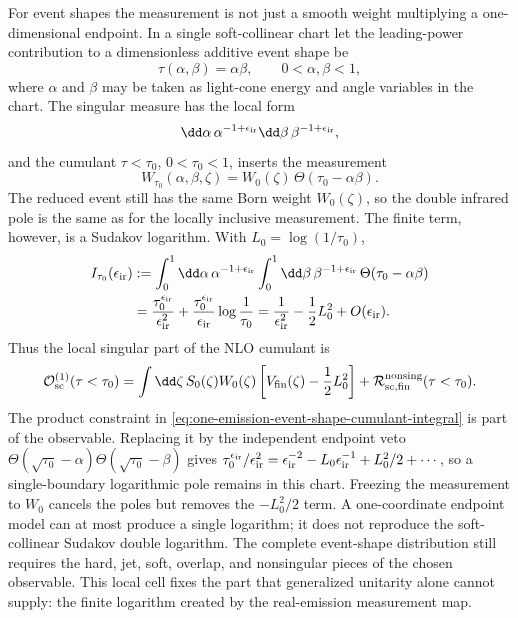\begin{controlledapproximation}
\label{ca:one-loop-event-shape-cumulant-cell}
For event shapes the measurement is not just a smooth weight multiplying a
one-dimensional endpoint.  In a single soft-collinear chart let the leading-power
contribution to a dimensionless additive event shape be
\[
  \tau(\alpha,\beta)=\alpha\beta,
  \qquad
  0<\alpha,\beta<1 ,
\]
where \(\alpha\) and \(\beta\) may be taken as light-cone energy and angle
variables in the chart.  The singular measure has the local form
\[
  \dd\alpha\,\alpha^{-1+\epsilon_{\rm ir}}
  \dd\beta\,\beta^{-1+\epsilon_{\rm ir}},
\]
and the cumulant \(\tau<\tau_0\), \(0<\tau_0<1\), inserts the measurement
\[
  W_{\tau_0}(\alpha,\beta,\zeta)
  =
  W_0(\zeta)\,\Theta(\tau_0-\alpha\beta).
\]
The reduced event still has the same Born weight \(W_0(\zeta)\), so the double
infrared pole is the same as for the locally inclusive measurement.  The finite
term, however, is a Sudakov logarithm.  With
\(L_0=\log(1/\tau_0)\),
\begin{equation}
\begin{aligned}
  I_{\tau_0}(\epsilon_{\rm ir})
  &:=
  \int_0^1\dd\alpha\,\alpha^{-1+\epsilon_{\rm ir}}
  \int_0^1\dd\beta\,\beta^{-1+\epsilon_{\rm ir}}\,
    \Theta(\tau_0-\alpha\beta) \\
  &=
  \frac{\tau_0^{\epsilon_{\rm ir}}}{\epsilon_{\rm ir}^2}
  +
  \frac{\tau_0^{\epsilon_{\rm ir}}}{\epsilon_{\rm ir}}
    \log\frac1{\tau_0}
  =
  \frac1{\epsilon_{\rm ir}^2}
  -
  \frac12 L_0^2
  +O(\epsilon_{\rm ir}) .
\end{aligned}
  \label{eq:one-emission-event-shape-cumulant-integral}
\end{equation}
Thus the local singular part of the NLO cumulant is
\begin{equation}
  \mathcal O_{\rm sc}^{(1)}(\tau<\tau_0)
  =
  \int\dd\zeta\,S_0(\zeta)W_0(\zeta)
  \left[
    V_{\rm fin}(\zeta)-\frac12 L_0^2
  \right]
  +
  \mathcal R_{{\rm sc},\rm fin}^{\rm nonsing}(\tau<\tau_0).
  \label{eq:one-emission-event-shape-cumulant-cell}
\end{equation}
The product constraint in
\eqref{eq:one-emission-event-shape-cumulant-integral} is part of the observable.
Replacing it by the independent endpoint veto
\(\Theta(\sqrt{\tau_0}-\alpha)\Theta(\sqrt{\tau_0}-\beta)\) gives
\(\tau_0^{\epsilon_{\rm ir}}/\epsilon_{\rm ir}^2
=\epsilon_{\rm ir}^{-2}-L_0\epsilon_{\rm ir}^{-1}
+L_0^2/2+\cdots\), so a single-boundary logarithmic pole remains in this chart.
Freezing the measurement to \(W_0\) cancels the poles but removes the
\(-L_0^2/2\) term.  A one-coordinate endpoint model can at most produce a single
logarithm; it does not reproduce the soft-collinear Sudakov double logarithm.
The complete event-shape distribution still requires the hard, jet, soft,
overlap, and nonsingular pieces of the chosen observable.  This local cell fixes
the part that generalized unitarity alone cannot supply: the finite logarithm
created by the real-emission measurement map.
\end{controlledapproximation}

